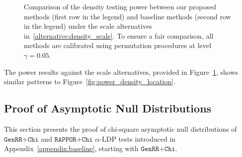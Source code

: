 \documentclass[twoside,11pt]{article}
\newcommand{\privacyParameter}{\alpha} %
\begin{document}
\begin{appendix}
\begin{figure}
		
		\caption{Comparison of the density testing power between our proposed methods (first row in the legend) and baseline methods (second row in the legend) under the scale alternatives in~\eqref{alternative:density_scale}. To ensure a fair comparison, all methods are calibrated using permutation procedures at level $\gamma = 0.05$.
		}
		\label{fig:power_density_scale}
	\end{figure}
	The power results against the scale  alternatives, provided in Figure~\ref{fig:power_density_scale}, shows similar patterns to Figure~\ref{fig:power_density_location}.
	
	\subsection{Proof of Asymptotic Null Distributions}
	This section presents the proof of chi-square asymptotic null distributions of $\texttt{GenRR+Chi}$ and $\texttt{RAPPOR+Chi}$ $\privacyParameter$-LDP tests introduced in Appendix~\ref{appendix:baseline}, starting with $\texttt{GenRR+Chi}$.

\end{appendix}
\end{document}
